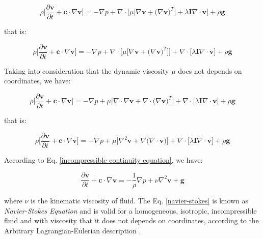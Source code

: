 \begin{equation} 
 \rho \Bigg[ \frac{\partial \textbf{v}}{\partial t} + \textbf{c} \cdot \nabla \textbf{v} \Bigg]
 =
 -
 \nabla p
 +
 \nabla \cdot \big[ 
 \mu \big[ \nabla \textbf{v} + \big( \nabla \textbf{v} \big)^{T} \big]
 + \lambda \textbf{I} \nabla \cdot \textbf{v}
 \big]
 +
 \rho \textbf{g}
\end{equation}


\medskip
\noindent
that is:

\begin{equation} 
 \rho \Bigg[ \frac{\partial \textbf{v}}{\partial t} + \textbf{c} \cdot \nabla \textbf{v} \Bigg]
 =
 -
 \nabla p
 +
 \nabla \cdot \big[ \mu \big[ \nabla \textbf{v} + \big( \nabla \textbf{v} \big)^{T} \big] \big]
 + 
 \nabla \cdot \big[ \lambda \textbf{I} \nabla \cdot \textbf{v} \big]
 +
 \rho \textbf{g}
\end{equation}


\medskip
\noindent
Taking into consideration that the dynamic viscosity 
$\mu$ does not depends on coordinates,
we have:

\begin{equation} 
 \rho \Bigg[ \frac{\partial \textbf{v}}{\partial t} + \textbf{c} \cdot \nabla \textbf{v} \Bigg]
 =
 -
 \nabla p
 +
 \mu \big[ \nabla \cdot \nabla \textbf{v} + \nabla \cdot \big( \nabla \textbf{v} \big)^{T} \big]
 +
 \nabla \cdot \big[ \lambda \textbf{I} \nabla \cdot \textbf{v} \big]
 +
 \rho \textbf{g}
\end{equation}

\medskip
\noindent
that is:

\begin{equation} 
 \rho \Bigg[ \frac{\partial \textbf{v}}{\partial t} + \textbf{c} \cdot \nabla \textbf{v} \Bigg]
 =
 -
 \nabla p
 +
 \mu \big[ \nabla^{2} \textbf{v} + \nabla \big( \nabla \cdot \textbf{v} \big) \big]
 +
 \nabla \cdot \big[ \lambda \textbf{I} \nabla \cdot \textbf{v} \big]
 +
 \rho \textbf{g}
\end{equation}

\medskip
\noindent
According to Eq. \ref{incompressible continuity equation}, we have:

\begin{equation} \label{navier-stokes}
 \frac{\partial \textbf{v}}{\partial t} + \textbf{c} \cdot \nabla \textbf{v}
 =
 -
 \frac{1}{\rho} \nabla p
 +
 \nu \nabla^{2} \textbf{v}
 +
 \textbf{g}
\end{equation}

\medskip
\noindent
where $\nu$ is the kinematic viscosity of fluid.
 The Eq. \ref{navier-stokes} is known as
\textit{Navier-Stokes Equation} and is valid for a
homogeneous, isotropic, incompressible fluid
and with viscosity that it does not depends on coordinates,
according to the Arbitrary Lagrangian-Eulerian description
\cite{donea1982}.

